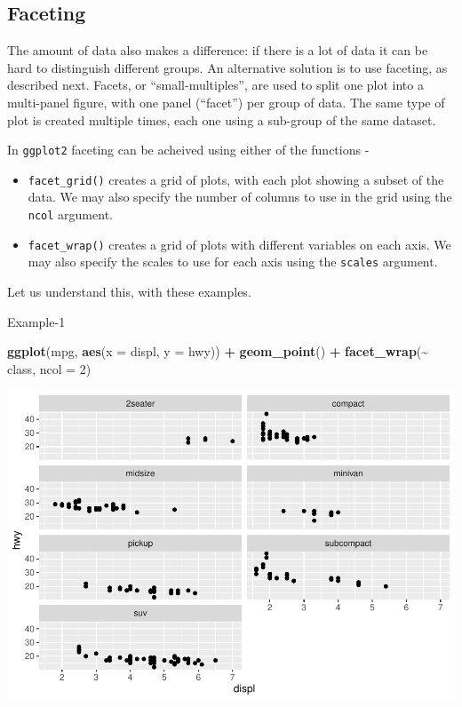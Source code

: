 \documentclass[
]{book}
\newenvironment{Shaded}{\begin{snugshade}}{\end{snugshade}}
\newcommand{\AttributeTok}[1]{\textcolor[rgb]{0.13,0.29,0.53}{#1}}
\newcommand{\DecValTok}[1]{\textcolor[rgb]{0.00,0.00,0.81}{#1}}
\newcommand{\FunctionTok}[1]{\textcolor[rgb]{0.13,0.29,0.53}{\textbf{#1}}}
\newcommand{\NormalTok}[1]{#1}
\newcommand{\SpecialCharTok}[1]{\textcolor[rgb]{0.81,0.36,0.00}{\textbf{#1}}}
\providecommand{\tightlist}{%
  \setlength{\itemsep}{0pt}\setlength{\parskip}{0pt}}
\begin{document}
\hypertarget{faceting}{%
\subsection{Faceting}\label{faceting}}

The amount of data also makes a difference: if there is a lot of data it can be hard to distinguish different groups. An alternative solution is to use faceting, as described next. Facets, or ``small-multiples'', are used to split one plot into a multi-panel figure, with one panel (``facet'') per group of data. The same type of plot is created multiple times, each one using a sub-group of the same dataset.

In \texttt{ggplot2} faceting can be acheived using either of the functions -

\begin{itemize}
\tightlist
\item
  \texttt{facet\_grid()} creates a grid of plots, with each plot showing a subset of the data. We may also specify the number of columns to use in the grid using the \texttt{ncol} argument.
\item
  \texttt{facet\_wrap()} creates a grid of plots with different variables on each axis. We may also specify the scales to use for each axis using the \texttt{scales} argument.
\end{itemize}

Let us understand this, with these examples.

Example-1

\begin{Shaded}
\begin{Highlighting}[]
\FunctionTok{ggplot}\NormalTok{(mpg, }\FunctionTok{aes}\NormalTok{(}\AttributeTok{x =}\NormalTok{ displ, }\AttributeTok{y =}\NormalTok{ hwy)) }\SpecialCharTok{+} 
  \FunctionTok{geom\_point}\NormalTok{() }\SpecialCharTok{+} 
  \FunctionTok{facet\_wrap}\NormalTok{(}\SpecialCharTok{\textasciitilde{}}\NormalTok{ class, }\AttributeTok{ncol =} \DecValTok{2}\NormalTok{)}
\end{Highlighting}
\end{Shaded}

\includegraphics{DauR_files/figure-latex/unnamed-chunk-210-1.pdf}
\end{document}
